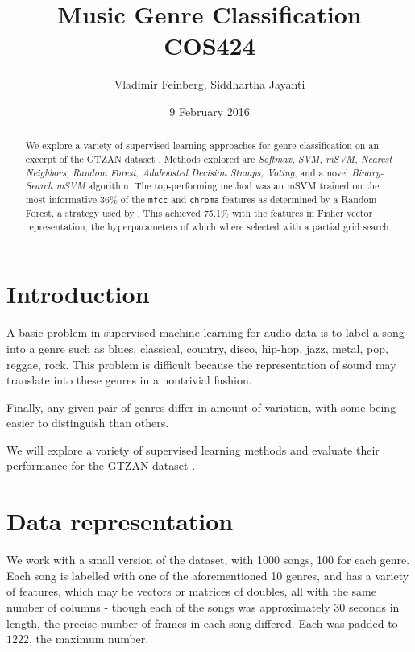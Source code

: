 \documentclass{article}
\title{Music Genre Classification\\\large COS424}
\author{Vladimir Feinberg, Siddhartha Jayanti}
\date{9 February 2016}
\begin{document}
\maketitle

\begin{abstract}

We explore a variety of supervised learning approaches for genre classification on an excerpt of the GTZAN dataset \cite{TC}. Methods explored are {\em Softmax, SVM, mSVM, Nearest Neighbors, Random Forest, Adaboosted Decision Stumps, Voting}, and a novel {\em Binary-Search mSVM} algorithm.
The top-performing method was an mSVM trained on the most informative 36\% of the \texttt{mfcc} and \texttt{chroma} features as determined by a Random Forest, a strategy used by \cite{vox}. This achieved 75.1\% with the features in Fisher vector representation, the hyperparameters of which where selected with a partial grid search.

\end{abstract}
 \section{Introduction}

A basic problem in supervised machine learning for audio data is to label a song into a genre such as blues, classical, country, disco, hip-hop, jazz, metal, pop, reggae, rock.
This problem is difficult because the representation of sound may translate into these genres in a nontrivial fashion.

Finally, any given pair of genres differ in amount of variation, with some being easier to distinguish than others.

We will explore a variety of supervised learning methods and evaluate their performance for the GTZAN dataset \cite{TC}.

\section{Data representation}

We work with a small version of the dataset, with 1000 songs, 100 for each genre. Each song is labelled with one of the aforementioned 10 genres, and has a variety of features, which may be vectors or matrices of doubles, all with the same number of columns - though each of the songs was approximately 30 seconds in length, the precise number of frames in each song differed. Each was padded to $1222$, the maximum number.
\end{document}
